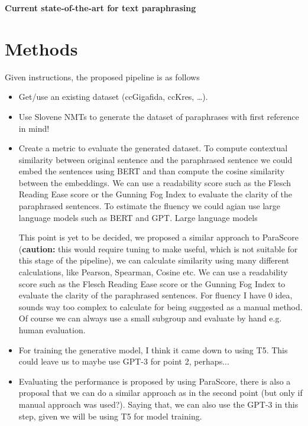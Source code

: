 \documentclass[fleqn,moreauthors,10pt]{ds_report}
\begin{document}
\textbf{Current state-of-the-art for text paraphrasing} 


\section*{Methods}

Given instructions, the proposed pipeline is as follows
 \begin{itemize}
     \item Get/use an existing dataset (ccGigafida, ccKres, …).
     \item Use Slovene NMTs to generate the dataset of paraphrases with first reference in mind!
     \item Create a metric to evaluate the generated dataset. To compute contextual similarity between original sentence and the paraphrased sentence we could embed the sentences using BERT and than compute the cosine similarity between the embeddings. We can use a readability score such as the Flesch Reading Ease score or the Gunning Fog Index to evaluate the clarity of the paraphrased sentences. To estimate the fluency we could agian use large language models such as BERT and GPT. Large language models 
     
     
     This point is yet to be decided, we proposed a similar approach to ParaScore (\textbf{caution:} this would require tuning to make useful, which is not suitable for this stage of the pipeline), we can calculate similarity using many different calculations, like Pearson, Spearman, Cosine etc. We can use a readability score such as the Flesch Reading Ease score or the Gunning Fog Index to evaluate the clarity of the paraphrased sentences. For fluency I have 0 idea, sounds way too complex to calculate for being suggested as a manual method. Of course we can always use a small subgroup and evaluate by hand e.g. human evaluation.
     \item For training the generative model, I think it came down to using T5. This could leave us to maybe use GPT-3 for point 2, perhaps...
     \item Evaluating the performance is proposed by using ParaScore, there is also a proposal that we can do a similar approach as in the second point (but only if manual approach was used?). Saying that, we can also use the GPT-3 in this step, given we will be using T5 for model training.
 \end{itemize}
\end{document}
